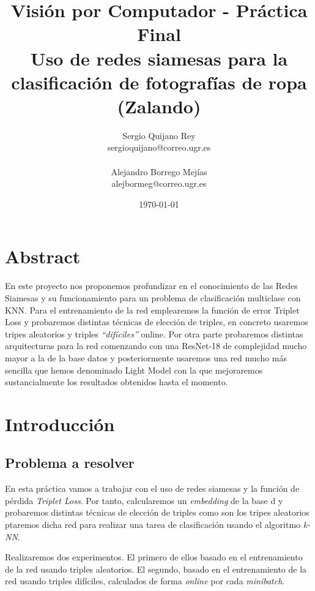 \documentclass[11pt]{article}
\title{
    {Visión por Computador - Práctica Final} \\
    {Uso de redes siamesas para la clasificación de fotografías de ropa (Zalando)}
}
\author{
    {Sergio Quijano Rey}\\
    {sergioquijano@correo.ugr.es} \\
    {}\\
    {Alejandro Borrego Mejías} \\
    {alejbormeg@correo.ugr.es}\\
}
\date{\today}
\newcommand{\entrecomillado}[1]{\emph{``#1''}}
\begin{document}
\maketitle
\pagebreak

\tableofcontents


\listoffigures

\listoftables

{}

\pagebreak

\section{Abstract}

En este proyecto nos proponemos profundizar en el conocimiento de las Redes Siamesas y su funcionamiento para un problema de clasificación multiclase con KNN. Para el entrenamiento de la red emplearemos la función de error Triplet Loss y probaremos distintas técnicas de elección de triples, en concreto usaremos tripes aleatorios y triples \entrecomillado{difíciles} online. Por otra parte probaremos distintas arquitecturas para la red comenzando con una ResNet-18 de complejidad mucho mayor a la de la base datos y posteriormente usaremos una red mucho más sencilla que hemos denominado Light Model con la que mejoraremos sustancialmente los resultados obtenidos hasta el momento.

\section{Introducción}

\subsection{Problema a resolver}

En esta práctica vamos a trabajar con el uso de redes siamesas y la función de pérdida \emph{Triplet Loss}. Por tanto, calcularemos un \emph{embedding} de la base d y probaremos distintas técnicas de elección de triples como son los tripes aleatorios ptaremos dicha red para realizar una tarea de clasificación usando el algoritmo \emph{k-NN}.

Realizaremos dos experimentos. El primero de ellos basado en el entrenamiento de la red usando triples aleatorios. El segundo, basado en el entrenamiento de la red usando triples difíciles, calculados de forma \emph{online} por cada \emph{minibatch}.
\end{document}
